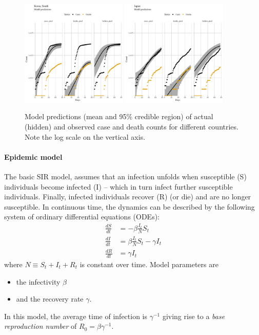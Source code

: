 \documentclass[a4paper]{tufte-handout}
\begin{document}
\begin{figure}
\begin{center}
    \includegraphics[width=0.45\textwidth]{../figs/model_pred_KOR.pdf}
    \includegraphics[width=0.45\textwidth]{../figs/model_pred_JPN.pdf}
  \end{center}
  \caption{\label{fig:modelpred} Model predictions (mean and 95\%
    credible region) of actual (hidden) and observed case and death
    counts for different countries. Note the log scale on the vertical
    axis.}
\end{figure}

\paragraph{Epidemic model}
The basic SIR model, assumes that an infection unfolds when
susceptible (S) individuals become infected (I) -- which in turn
infect further susceptible individuals. Finally, infected individuals
recover (R) (or die) and are no longer susceptible. In continuous
time, the dynamics can be described by the following system of
ordinary differential equations (ODEs):
\begin{align*}
  \frac{dS}{dt} &= - \beta \frac{I_t}{N} S_t \\
  \frac{dI}{dt} &= \beta \frac{I_t}{N} S_t - \gamma I_t \\
  \frac{dR}{dt} &= \gamma I_t
\end{align*}
where $N \equiv S_t + I_t + R_t$ is constant over time. Model
parameters are
\begin{itemize}
\item the infectivity $\beta$
\item and the recovery rate $\gamma$.
\end{itemize}
In this model, the average time of infection is $\gamma^{-1}$ giving
rise to a {\em base reproduction number} of $R_0 = \beta
\gamma^{-1}$.
\end{document}
